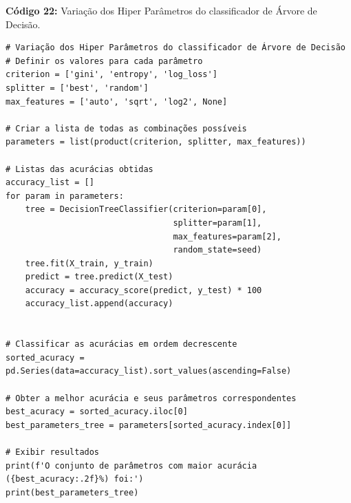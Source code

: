 \documentclass[a4paper,12pt]{article} %
\begin{document}
\begin{center}
\textbf{Código 22:} Variação dos Hiper Parâmetros do classificador de Árvore de Decisão.
\begin{verbatim}
# Variação dos Hiper Parâmetros do classificador de Árvore de Decisão
# Definir os valores para cada parâmetro
criterion = ['gini', 'entropy', 'log_loss']
splitter = ['best', 'random']
max_features = ['auto', 'sqrt', 'log2', None]

# Criar a lista de todas as combinações possíveis
parameters = list(product(criterion, splitter, max_features))

# Listas das acurácias obtidas
accuracy_list = []
for param in parameters:
    tree = DecisionTreeClassifier(criterion=param[0],
                                  splitter=param[1],
                                  max_features=param[2],
                                  random_state=seed)
    tree.fit(X_train, y_train)
    predict = tree.predict(X_test)
    accuracy = accuracy_score(predict, y_test) * 100
    accuracy_list.append(accuracy)


# Classificar as acurácias em ordem decrescente
sorted_acuracy = pd.Series(data=accuracy_list).sort_values(ascending=False)

# Obter a melhor acurácia e seus parâmetros correspondentes
best_acuracy = sorted_acuracy.iloc[0]
best_parameters_tree = parameters[sorted_acuracy.index[0]]

# Exibir resultados
print(f'O conjunto de parâmetros com maior acurácia ({best_acuracy:.2f}%) foi:')
print(best_parameters_tree)
\end{verbatim}
\end{center}
\end{document}
